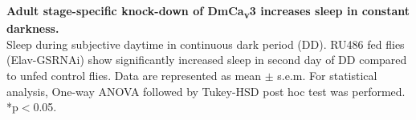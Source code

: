 \label{fig:S}
\textbf{Adult stage-specific knock-down of DmCa\textsubscript{v}3 increases sleep in constant darkness.}
\\
Sleep during subjective daytime in continuous dark period (DD). 
RU486 fed flies (Elav-GS\>RNAi) show significantly increased sleep in second day of DD compared to unfed control flies.
Data are represented as mean $\pm$ s.e.m.
For statistical analysis, One-way ANOVA followed by Tukey-HSD post hoc test was performed.
*p$<$0.05.
  


  
  